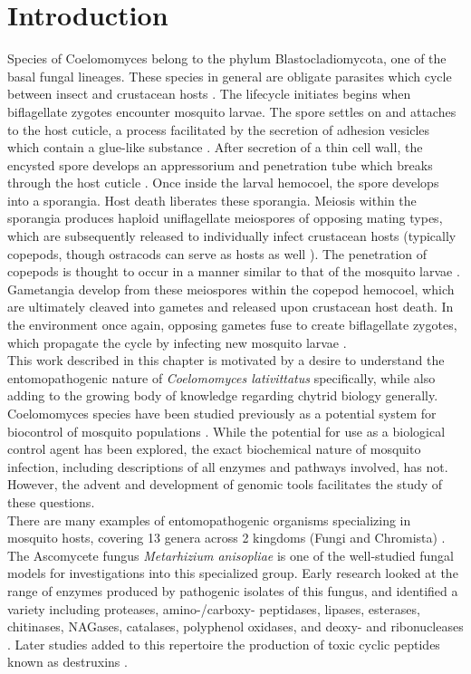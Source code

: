 \section{Introduction}
Species of Coelomomyces belong to the phylum Blastocladiomycota, one of the basal fungal lineages. These species in general are obligate parasites which cycle between insect and crustacean hosts \cite{Whisler1975}. The lifecycle initiates begins when biflagellate zygotes encounter mosquito larvae. The spore settles on and attaches to the host cuticle, a process facilitated by the secretion of adhesion vesicles which contain a glue-like substance \cite{Travland1979}. After secretion of a thin cell wall, the encysted spore develops an appressorium and penetration tube which breaks through the host cuticle \cite{Zebold1979}. Once inside the larval hemocoel, the spore develops into a sporangia. Host death liberates these sporangia. Meiosis within the sporangia produces haploid uniflagellate meiospores of opposing mating types, which are subsequently released to individually infect crustacean hosts (typically copepods, though ostracods can serve as hosts as well \cite{Whisler2009}). The penetration of copepods is thought to occur in a manner similar to that of the mosquito larvae \cite{Zebold1979}. Gametangia develop from these meiospores within the copepod hemocoel, which are ultimately cleaved into gametes and released upon crustacean host death. In the environment once again, opposing gametes fuse to create biflagellate zygotes, which propagate the cycle by infecting new mosquito larvae \cite{Whisler1975}.\\
\indent This work described in this chapter is motivated by a desire to understand the entomopathogenic nature of \textit{Coelomomyces lativittatus} specifically, while also adding to the growing body of knowledge regarding chytrid biology generally. \\
\indent Coelomomyces species have been studied previously as a potential system for biocontrol of mosquito populations \cite{Scholte2004}. While the potential for use as a biological control agent has been explored, the exact biochemical nature of mosquito infection, including descriptions of all enzymes and pathways involved, has not. However, the advent and development of genomic tools facilitates the study of these questions.\\
\indent There are many examples of entomopathogenic organisms specializing in mosquito hosts, covering 13 genera across 2 kingdoms (Fungi and Chromista) \cite{Scholte2004}. The Ascomycete fungus \textit{Metarhizium anisopliae} is one of the well-studied fungal models for investigations into this specialized group. Early research looked at the range of enzymes produced by pathogenic isolates of this fungus, and identified a variety including proteases, amino-/carboxy- peptidases, lipases, esterases, chitinases, NAGases, catalases, polyphenol oxidases, and deoxy- and ribonucleases \cite{StLeger1986}. Later studies added to this repertoire the production of toxic cyclic peptides known as destruxins \cite{Wang2012}. \\ 
